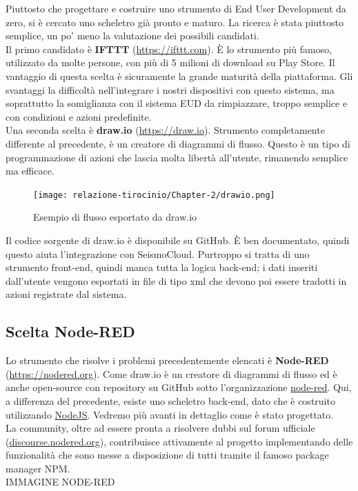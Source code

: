 \documentclass[a4paper,10pt]{memoir}
\begin{document}
Piuttosto che progettare e costruire uno strumento di End User Development da zero, si è cercato uno scheletro già pronto e maturo. La ricerca è stata piuttosto semplice, un po' meno la valutazione dei possibili candidati.
\\
Il primo candidato è \textbf{IFTTT} (\href{https://iftt.com}{https://ifttt.com}). È lo strumento più famoso, utilizzato da molte persone, con più di 5 milioni di download su Play Store. Il vantaggio di questa scelta è sicuramente la grande maturità della piattaforma. Gli svantaggi la difficoltà nell'integrare i nostri dispositivi con questo sistema, ma soprattutto la somiglianza con il sistema EUD da rimpiazzare, troppo semplice e con condizioni e azioni predefinite.
\\
Una seconda scelta è \textbf{draw.io} (\href{https://app.diagrams.net/}{https://draw.io}). Strumento completamente differente al precedente, è un creatore di diagrammi di flusso. Questo è un tipo di programmazione di azioni che lascia molta libertà all'utente, rimanendo semplice ma efficace. 
\begin{figure}[H]
\caption{Esempio di flusso esportato da draw.io}
\label{fig:drawio}
\texttt{[image: relazione-tirocinio/Chapter-2/drawio.png]}
\end{figure}
Il codice sorgente di draw.io è disponibile su GitHub. È  ben documentato, quindi questo aiuta l'integrazione con SeismoCloud. Purtroppo si tratta di uno strumento front-end, quindi manca tutta la logica back-end; i dati inseriti dall'utente vengono esportati in file di tipo xml che devono poi essere tradotti in azioni registrate dal sistema. 
\\

\subsection{Scelta Node-RED}
Lo strumento che risolve i problemi precedentemente elencati è \textbf{Node-RED} (\href{https://nodered.org}{https://nodered.org}).
Come draw.io è un creatore di diagrammi di flusso ed è anche open-source con repository su GitHub sotto l'organizzazione \href{https://github.com/node-red}{node-red}.
Qui, a differenza del precedente, esiste uno scheletro back-end, dato che è costruito utilizzando \href{https://nodejs.org}{NodeJS}. Vedremo più avanti in dettaglio come è stato progettato.\\
La community, oltre ad essere pronta a risolvere dubbi sul forum ufficiale (\href{https://discourse.nodered.org}{discourse.nodered.org}), contribuisce attivamente al progetto implementando delle funzionalità che sono messe a disposizione di tutti tramite il famoso package manager NPM.
\\
IMMAGINE NODE-RED
\\
\clearpage
\end{document}
